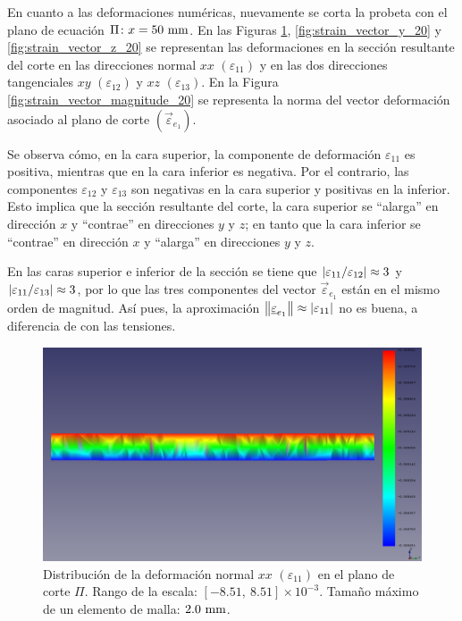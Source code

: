 En cuanto a las deformaciones numéricas, nuevamente se corta la probeta con el plano de ecuación $\Pi \colon x = 50 \ \milli\meter$. En las Figuras \ref{fig:strain_vector_x_20}, \ref{fig:strain_vector_y_20} y \ref{fig:strain_vector_z_20} se representan las deformaciones en la sección resultante del corte en las direcciones normal $xx$ $(\varepsilon_{11})$ y en las dos direcciones tangenciales $xy$ $(\varepsilon_{12})$ y $xz$ $(\varepsilon_{13})$. En la Figura \ref{fig:strain_vector_magnitude_20} se representa la norma del vector deformación asociado al plano de corte $(\vec{\varepsilon}_{e_1})$.

Se observa cómo, en la cara superior, la componente de deformación $\varepsilon_{11}$ es positiva, mientras que en la cara inferior es negativa. Por el contrario, las componentes $\varepsilon_{12}$ y $\varepsilon_{13}$ son negativas en la cara superior y positivas en la inferior. Esto implica que la sección resultante del corte, la cara superior se ``alarga'' en dirección $x$ y ``contrae'' en direcciones $y$ y $z$; en tanto que la cara inferior se ``contrae'' en dirección $x$ y ``alarga'' en direcciones $y$ y $z$. 

En las caras superior e inferior de la sección se tiene que $\abs{\varepsilon_{11} / \varepsilon_{12}} \approx 3$ y  $\abs{\varepsilon_{11} / \varepsilon_{13}} \approx 3$, por lo que las tres componentes del vector $\vec{\varepsilon}_{e_1}$ están en el mismo orden de magnitud. Así pues, la aproximación $\norm{\vec{\varepsilon}_{e_1}} \approx \abs{\varepsilon_{11}}$ no es buena, a diferencia de con las tensiones.

\begin{figure}[H]
    \centering
    \includegraphics[width=\textwidth]{figures/resultados/strain_vector_x_20.pdf}
    \caption{Distribución de la deformación normal $xx$ $(\varepsilon_{11})$ en el plano de corte $\Pi$. Rango de la escala: $[-8.51, \ 8.51] \times 10^{-3}$. Tamaño máximo de un elemento de malla: $2.0 \ \milli\meter$.}
    \label{fig:strain_vector_x_20}
\end{figure}

